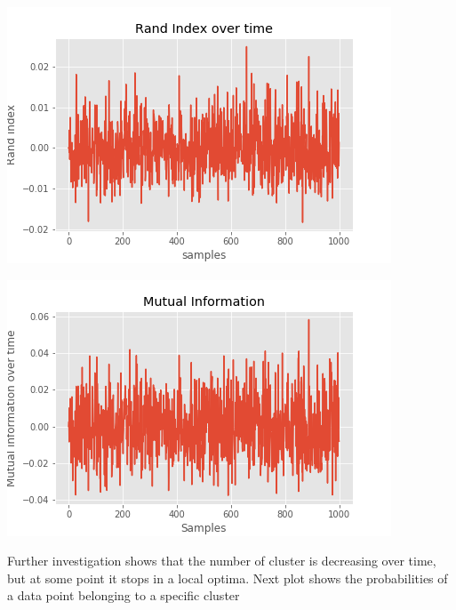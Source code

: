 \documentclass[]{article}
\begin{document}
	\begin{center}
		
		\includegraphics[width=.6\textwidth]{task6/figures/T_3_1/Q2/rand_index.png}
		
		\includegraphics[width=.6\textwidth]{task6/figures/T_3_1/Q2/mutual_information.png}
		
	\end{center}	
	
	Further investigation shows that the number of cluster is decreasing over time, but at some point it stops in a local optima. Next plot shows the probabilities of a data point belonging to a specific cluster
	
\end{document}

